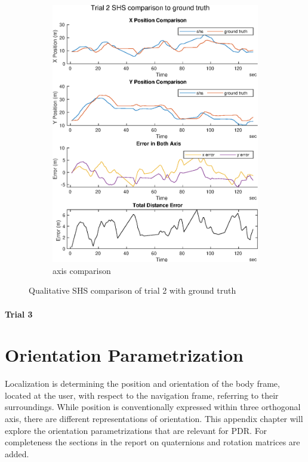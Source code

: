 \begin{figure}[H]
\begin{subfigure}[t]{.45\textwidth}
		\includegraphics[width=\linewidth]{images/20201029_1042_trial2_shs_2}
		\caption{axis comparison}
		\label{fig:trial2_comparison}
	\end{subfigure}
\setlength{\belowcaptionskip}{-20pt}
	\caption{Qualitative SHS comparison of trial 2 with ground truth}
	\label{fig:trial2_shs_gt_comparison}
\end{figure}

\subsubsection{Trial 3}

\chapter{Orientation Parametrization} \label{chap:appen-orientparam}

Localization is determining the position and orientation of the body frame, located at the user, with respect to the navigation frame, referring to their surroundings. While position is conventionally expressed within three orthogonal axis, there are different representations of orientation. This appendix chapter will explore the orientation parametrizations that are relevant for \ac{PDR}. For completeness the sections in the report on quaternions and rotation matrices are added.


